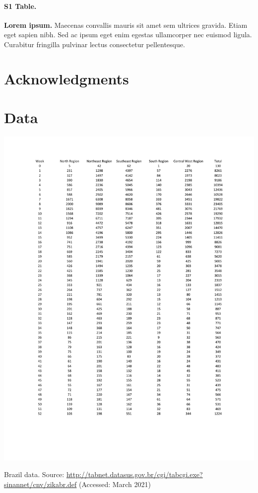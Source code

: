 \documentclass[10pt,letterpaper]{article}
\begin{document}
\paragraph*{S1 Table.}
\label{S1_Table}
{\bf Lorem ipsum.} Maecenas convallis mauris sit amet sem ultrices gravida. Etiam eget sapien nibh. Sed ac ipsum eget enim egestas ullamcorper nec euismod ligula. Curabitur fringilla pulvinar lectus consectetur pellentesque.

\section*{Acknowledgments}

\nolinenumbers


\pagebreak
\appendix
\section{Data}
\begin{table}
    \centering
    \includegraphics[height = 0.85\textheight,  trim = 2cm 4cm 2cm 4cm]{Zika_PE_figs/Brazil_zika_by_region.pdf}
    \caption{Brazil data. Source: \url{http://tabnet.datasus.gov.br/cgi/tabcgi.exe?sinannet/cnv/zikabr.def} (Accessed: March 2021)}
    \label{tab:zika_data}
\end{table}
\end{document}
